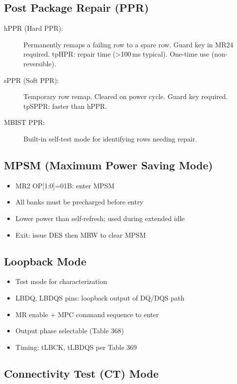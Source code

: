 \documentclass[10pt,a4paper,twoside]{article}
\begin{document}
\subsection{Post Package Repair (PPR)}

\begin{description}
  \item[hPPR (Hard PPR):] Permanently remaps a failing row to a spare row.
    Guard key in MR24 required. tpHPR: repair time (\textgreater{}100\,ms typical).
    One-time use (non-reversible).
  \item[sPPR (Soft PPR):] Temporary row remap. Cleared on power cycle.
    Guard key required. tpSPPR: faster than hPPR.
  \item[MBIST PPR:] Built-in self-test mode for identifying rows needing repair.
\end{description}

\subsection{MPSM (Maximum Power Saving Mode)}

\begin{itemize}
  \item MR2 OP[1:0]=01B: enter MPSM
  \item All banks must be precharged before entry
  \item Lower power than self-refresh; used during extended idle
  \item Exit: issue DES then MRW to clear MPSM
\end{itemize}

\subsection{Loopback Mode}

\begin{itemize}
  \item Test mode for characterization
  \item LBDQ, LBDQS pins: loopback output of DQ/DQS path
  \item MR enable + MPC command sequence to enter
  \item Output phase selectable (Table 368)
  \item Timing: tLBCK, tLBDQS per Table 369
\end{itemize}

\subsection{Connectivity Test (CT) Mode}
\end{document}
